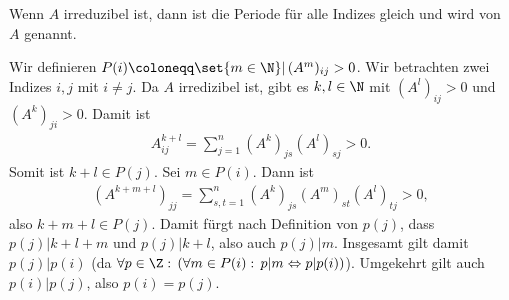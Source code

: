 \begin{lemma}
  Wenn $A$ irreduzibel ist, dann ist die Periode für alle Indizes gleich und wird  von $A$ genannt. 
\end{lemma}
\begin{beweis}
  Wir definieren $P(i) \coloneqq \set{m \in \N} |\, (A^m)_{ij} > 0$. Wir betrachten zwei Indizes $i, j$ mit $i \neq j$. Da $A$ irredizibel ist, gibt es $k, l \in \N$ mit $(A^l)_{ij}>0$ und $(A^k)_{ji}>0$. Damit ist 
  \begin{align*}
    A^{k+l}_{ij} = \sum_{j = 1}^n (A^k)_{js} (A^l)_{sj} > 0.
  \end{align*}
Somit ist $k + l \in P(j)$. Sei $m \in P(i)$. Dann ist 
\begin{align*}
  (A^{k+ m+ l})_{jj} = \sum_{s, t = 1}^n (A^k)_{js}(A^m)_{st}(A^l)_{tj}>0, 
\end{align*}
also $k + m+ l \in P(j)$. Damit fürgt nach Definition von $p(j)$, dass $p(j) | k + l+ m$ und $p(j) | k+ l$, also auch $p(j) | m$. Insgesamt gilt damit $p(j)|p(i)$  (da $\forall p \in \Z: \, (\forall m \in P(i): \, p | m \Leftrightarrow p |p(i))$). Umgekehrt gilt auch $p(i)|p(j)$, also $p(i) = p(j)$.
\end{beweis}